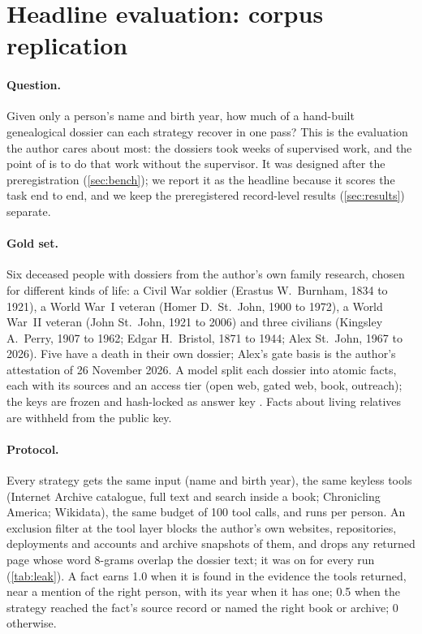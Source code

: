 \section{Headline evaluation: corpus replication}
\label{sec:corpus}

\paragraph{Question.} Given only a person's name and birth year, how much of a hand-built genealogical dossier can each strategy recover in one pass? This is the evaluation the author cares about most: the dossiers took weeks of supervised work, and the point of \CR is to do that work without the supervisor. It was designed after the preregistration (\cref{sec:bench}); we report it as the headline because it scores the task end to end, and we keep the preregistered record-level results (\cref{sec:results}) separate.

\paragraph{Gold set.} Six deceased people with dossiers from the author's own family research, chosen for different kinds of life: a Civil War soldier (Erastus W.\ Burnham, 1834 to 1921), a World War~I veteran (Homer D.\ St.\ John, 1900 to 1972), a World War~II veteran (John St.\ John, 1921 to 2006) and three civilians (Kingsley A.\ Perry, 1907 to 1962; Edgar H.\ Bristol, 1871 to 1944; Alex St.\ John, 1967 to 2026). Five have a death in their own dossier; Alex's gate basis is the author's attestation of 26 November 2026. A model split each dossier into atomic facts, each with its sources and an access tier (open web, gated web, book, outreach); the keys are frozen and hash-locked as answer key . Facts about living relatives are withheld from the public key.

\paragraph{Protocol.} Every strategy gets the same input (name and birth year), the same keyless tools (Internet Archive catalogue, full text and search inside a book; Chronicling America; Wikidata), the same budget of 100 tool calls, and  runs per person. An exclusion filter at the tool layer blocks the author's own websites, repositories, deployments and accounts and archive snapshots of them, and drops any returned page whose word 8-grams overlap the dossier text; it was on for every run (\cref{tab:leak}). A fact earns 1.0 when it is found in the evidence the tools returned, near a mention of the right person, with its year when it has one; 0.5 when the strategy reached the fact's source record or named the right book or archive; 0 otherwise.

